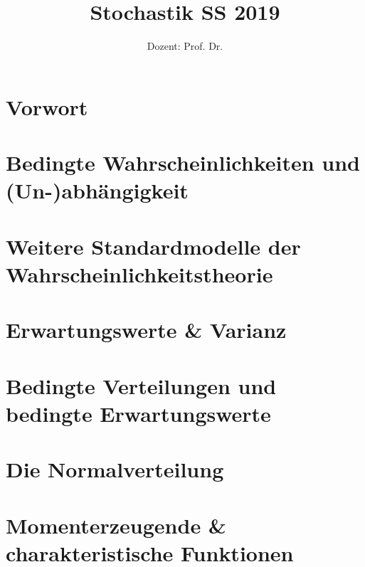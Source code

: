 \documentclass[ngerman,a4paper,order=firstname]{local_mathscript} %
\title{\textbf{Stochastik SS 2019}}
\author{Dozent: Prof. Dr. \person{Anita Behme}}
\begin{document}
\pagestyle{plain}

\maketitle

\hypertarget{tocpage}{}
\tableofcontents
{}

\pagebreak
{}
\pagestyle{fancy}

\chapter*{Vorwort}





\chapter[Bedingte Wkeiten und (Un-)abbhängigkeit]{Bedingte Wahrscheinlichkeiten und (Un-)ab\-hängigkeit}


\chapter{Weitere Standardmodelle der Wahrscheinlichkeitstheorie}


\chapter{Erwartungswerte \& Varianz}



\chapter{Bedingte Verteilungen und bedingte Erwartungswerte}


\chapter{Die Normalverteilung}

\chapter{Momenterzeugende \& charakteristische Funktionen}

\end{document}
